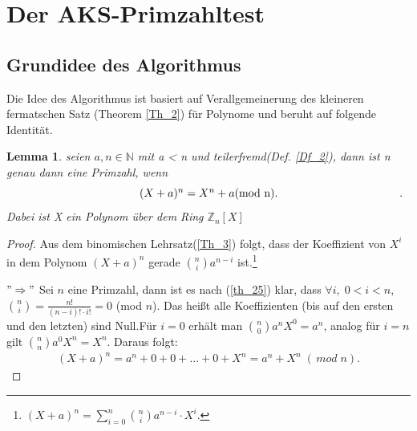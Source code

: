 \documentclass[12pt,oneside]{article}
\newtheorem{lemma}[theorem]{Lemma}
\theoremstyle{remark}
\theoremstyle{definition}
\begin{document}
\section{Der AKS-Primzahltest}
\subsection{Grundidee des Algorithmus}
Die Idee des Algorithmus ist basiert auf  Verallgemeinerung des kleineren fermatschen Satz (Theorem \ref{Th_2}) für Polynome und beruht auf folgende Identität.
\begin{flushleft}
\begin{lemma}\label{hauptlemma}
seien $a,n \in \mathbb{N}$ mit a < n und teilerfremd(Def. \ref{Df_2}), dann ist n genau dann eine Primzahl, wenn \newline
\begin{equation}\label{eq:1}
\centerline{ $(X + a)^n = X^n +a $(mod n).}.
\end{equation}\newline
Dabei ist X ein Polynom über dem Ring $\mathbb{Z}_{n}[X]$
\end{lemma}
\begin{proof}
Aus dem binomischen Lehrsatz(\ref{Th_3}) folgt, dass der Koeffizient von $X^i$ in dem Polynom $(X + a)^n$ gerade ${n \choose i} a^{n-i}$ ist.\footnote{$(X + a)^n = \sum_{i = 0}^{n}{n \choose i} a^{n - i} \cdot
X^i$.}\newline\newline

$"\Rightarrow"$\newline
Sei $n$ eine Primzahl, dann ist es nach (\ref{th_25}) klar, dass $\forall i , \;  0 < i < n$,\newline\smallskip ${n \choose i} = \frac{n!}{(n-i)! \cdot i!} = 0 $ (mod $n$). Das heißt alle Koeffizienten (bis auf den ersten und den letzten) sind Null.\newline\newline Für $i = 0$ erhält man  ${n \choose 0} a^n X^0 = a^n$, analog für $i = n$ gilt ${n \choose n} a^0 X^n = X^n$. Daraus folgt:
\begin{align*}
    (X + a)^n = a^n + 0 + 0 + ... + 0 + X^n = a^n + X^n \; ( \, mod \; n).
\end{align*}


\end{proof}
\end{flushleft}
\end{document}
